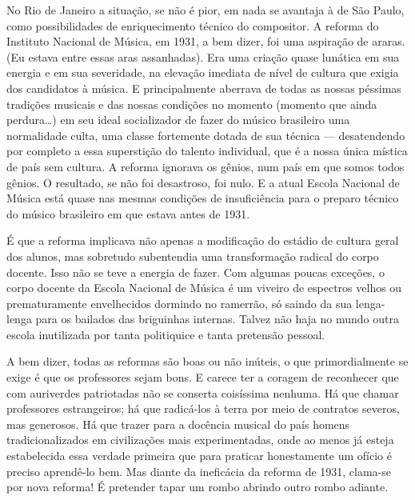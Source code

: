 No Rio de Janeiro a situação, se não é pior, em nada se avantaja à de
São Paulo, como possibilidades de enriquecimento técnico do compositor.
A reforma do Instituto Nacional de Música, em 1931, a bem dizer, foi uma
aspiração de araras. (Eu estava entre essas aras assanhadas). Era uma
criação quase lunática em sua energia e em sua severidade, na elevação
imediata de nível de cultura que exigia dos candidatos à música. E
principalmente aberrava de todas as nossas péssimas tradições musicais e
das nossas condições no momento (momento que ainda perdura\ldots{}) em seu
ideal socializador de fazer do músico brasileiro uma normalidade culta,
uma classe fortemente dotada de sua técnica --- desatendendo por completo
a essa superstição do talento individual, que é a nossa única mística de
país sem cultura. A reforma ignorava os gênios, num país em que somos
todos gênios. O resultado, se não foi desastroso, foi nulo. E a atual
Escola Nacional de Música está quase nas mesmas condições de
insuficiência para o preparo técnico do músico brasileiro em que estava
antes de 1931.

É que a reforma implicava não apenas a modificação do estádio de cultura
geral dos alunos, mas sobretudo subentendia uma transformação radical do
corpo docente. Isso não se teve a energia de fazer. Com algumas poucas
exceções, o corpo docente da Escola Nacional de Música é um viveiro de
espectros velhos ou prematuramente envelhecidos dormindo no ramerrão, só
saindo da sua lenga-lenga para os bailados das briguinhas internas.
Talvez não haja no mundo outra escola inutilizada por tanta politiquice
e tanta pretensão pessoal.

A bem dizer, todas as reformas são boas ou não inúteis, o que
primordialmente se exige é que os professores sejam bons. E carece ter a
coragem de reconhecer que com auriverdes patriotadas não se conserta
coisíssima nenhuma. Há que chamar professores estrangeiros; há que
radicá-los à terra por meio de contratos severos, mas generosos. Há que
trazer para a docência musical do país homens tradicionalizados em
civilizações mais experimentadas, onde ao menos já esteja estabelecida
essa verdade primeira que para praticar honestamente um ofício é preciso
aprendê-lo bem. Mas diante da ineficácia da reforma de 1931, clama-se por
nova reforma! É pretender tapar um rombo abrindo outro rombo adiante.

